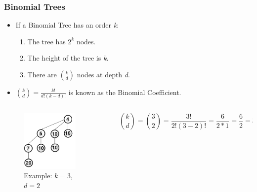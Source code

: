 \documentclass[13pt]{beamer}
\begin{document}
\begin{frame}
\frametitle{Binomial Trees}
  \begin{itemize}
    \item If a Binomial Tree has an order \textit{k}:
          \begin{enumerate}
            \item The tree has $2^k$ nodes.
            \item The height of the tree is \textit{k}.
            \item There are ${k \choose d}$ nodes at depth \textit{d}.
          \end{enumerate}
    \item ${k \choose d} = \frac{k!}{d! (k - d)!}$ is known as the Binomial Coefficient.
  \end{itemize}

  \begin{columns}[T] %
    \begin{column}[T]{4cm} %
      \begin{figure}
        \caption{Example: $k = 3$, $d = 2$}
        \includegraphics[height=3cm]{./img/order3.png}
      \end{figure}
      \centering
    \end{column}
    \begin{column}[T]{7cm} %
      $$
        {k \choose d} = {3 \choose 2} = \frac{3!}{2! (3 - 2)!} = \frac{6}{2 * 1} = \frac{6}{2} = 3
      $$
    \end{column}
  \end{columns}
\end{frame}
\end{document}
